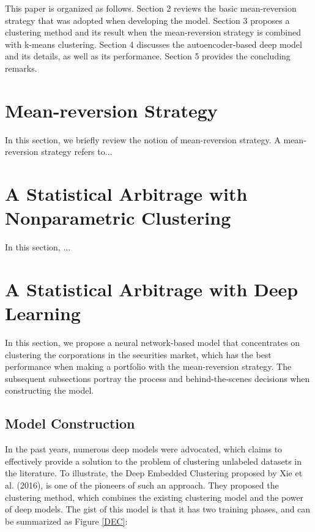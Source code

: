 \documentclass[11pt]{article}
\begin{document}
This paper is organized as follows. Section 2 reviews the basic mean-reversion strategy that was adopted when developing the model. Section 3 proposes a clustering method and its result when the mean-reversion strategy is combined with k-means clustering. Section 4 discusses the autoencoder-based deep model and its details, as well as its performance. Section 5 provides the concluding remarks.





\section{Mean-reversion Strategy}
In this section, we briefly review the notion of mean-reversion strategy. A mean-reversion strategy refers to...





\section{A Statistical Arbitrage with Nonparametric Clustering}
In this section, ...



\section{A Statistical Arbitrage with Deep Learning}
In this section, we propose a neural network-based model that concentrates on clustering the corporations in the securities market, which has the best performance when making a portfolio with the mean-reversion strategy. The subsequent subsections portray the process and behind-the-scenes decisions when constructing the model.

\subsection{Model Construction}
In the past years, numerous deep models were advocated, which claims to effectively provide a solution to the problem of clustering unlabeled datasets in the literature. To illustrate, the Deep Embedded Clustering proposed by Xie et al. (2016), is one of the pioneers of such an approach. They proposed the clustering method, which combines the existing clustering model and the power of deep models. The gist of this model is that it has two training phases, and can be summarized as Figure \ref{DEC}: 
\end{document}
